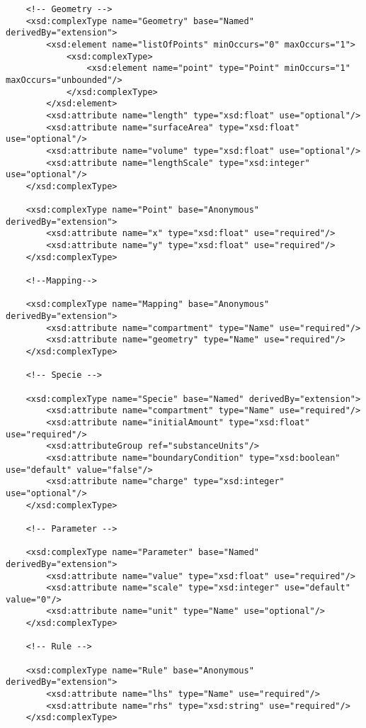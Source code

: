 \documentclass[10pt]{article}
\begin{document}
\begin{small}
\begin{verbatim}
    <!-- Geometry -->
    <xsd:complexType name="Geometry" base="Named" derivedBy="extension">
        <xsd:element name="listOfPoints" minOccurs="0" maxOccurs="1">
            <xsd:complexType>
                <xsd:element name="point" type="Point" minOccurs="1" maxOccurs="unbounded"/>
            </xsd:complexType>
        </xsd:element>
        <xsd:attribute name="length" type="xsd:float" use="optional"/>
        <xsd:attribute name="surfaceArea" type="xsd:float" use="optional"/>
        <xsd:attribute name="volume" type="xsd:float" use="optional"/>
        <xsd:attribute name="lengthScale" type="xsd:integer" use="optional"/>
    </xsd:complexType>

    <xsd:complexType name="Point" base="Anonymous" derivedBy="extension">
        <xsd:attribute name="x" type="xsd:float" use="required"/>
        <xsd:attribute name="y" type="xsd:float" use="required"/>
    </xsd:complexType>

    <!--Mapping-->

    <xsd:complexType name="Mapping" base="Anonymous" derivedBy="extension">
        <xsd:attribute name="compartment" type="Name" use="required"/>
        <xsd:attribute name="geometry" type="Name" use="required"/>
    </xsd:complexType>

    <!-- Specie -->

    <xsd:complexType name="Specie" base="Named" derivedBy="extension">
        <xsd:attribute name="compartment" type="Name" use="required"/>
        <xsd:attribute name="initialAmount" type="xsd:float" use="required"/>
        <xsd:attributeGroup ref="substanceUnits"/>
        <xsd:attribute name="boundaryCondition" type="xsd:boolean" use="default" value="false"/>
        <xsd:attribute name="charge" type="xsd:integer" use="optional"/>
    </xsd:complexType>

    <!-- Parameter -->

    <xsd:complexType name="Parameter" base="Named" derivedBy="extension">
        <xsd:attribute name="value" type="xsd:float" use="required"/>
        <xsd:attribute name="scale" type="xsd:integer" use="default" value="0"/>
        <xsd:attribute name="unit" type="Name" use="optional"/>
    </xsd:complexType>

    <!-- Rule -->

    <xsd:complexType name="Rule" base="Anonymous" derivedBy="extension">
        <xsd:attribute name="lhs" type="Name" use="required"/>
        <xsd:attribute name="rhs" type="xsd:string" use="required"/>
    </xsd:complexType>


\end{verbatim}
\end{small}
\end{document}
